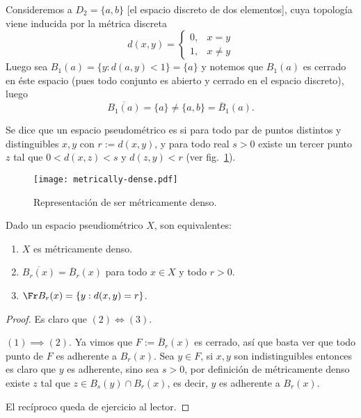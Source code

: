 \documentclass[topologia-analisis.tex]{subfiles}
\begin{document}
\begin{exn}[$D_2$]
	Consideremos a $D_2 = \{a, b\}$ [el espacio discreto de dos elementos], cuya topología viene inducida por la métrica discreta
	$$ d(x, y) =
	\begin{cases}
		0, &x=y \\
		1, &x\ne y
	\end{cases} $$
	Luego sea $B_1(a) = \{ y : d(a, y) < 1 \} = \{a\}$ y notemos que $B_1(a)$ es cerrado en éste espacio (pues todo conjunto es abierto y cerrado en el
	espacio discreto), luego
	$$ \overline{B_1(a)} = \{a\} \ne \{a, b\} = \overline B_1(a). $$
\end{exn}

\begin{mydef}
	Se dice que un espacio pseudométrico es  si para todo par de puntos distintos y distinguibles $x, y$ con $r := d(x, y)$,
	y para todo real $s > 0$ existe un tercer punto $z$ tal que $0 < d(x, z) < s$ y $d(z, y) < r$ (ver fig.~\ref{fig:metrically-dense}).
\end{mydef}
\begin{figure}[!hbt]
	\centering
	\texttt{[image: metrically-dense.pdf]}
	\caption{Representación de ser métricamente denso.}%
	\label{fig:metrically-dense}
\end{figure}

\begin{thm}
	Dado un espacio pseudiométrico $X$, son equivalentes:
	\begin{enumerate}
		\item $X$ es métricamente denso.
		\item $\overline{ B_r(x) } = \overline B_r(x)$ para todo $x\in X$ y todo $r > 0$.
		\item $\Fr B_r(x) = \{ y : d(x, y) = r \}$.
	\end{enumerate}
\end{thm}
\begin{proof}
	Es claro que $(2) \iff (3)$.
	\par
	$(1) \implies (2)$.
	Ya vimos que $F := \overline B_r(x)$ es cerrado, así que basta ver que todo punto de $F$ es adherente a $B_r(x)$.
	Sea $y \in F$, si $x,y$ son indistinguibles entonces es claro que $y$ es adherente, sino sea $s > 0$,
	por definición de métricamente denso existe $z$ tal que $z \in B_s(y) \cap B_r(x)$, es decir, $y$ es adherente a $B_r(x)$.
	\par
	El recíproco queda de ejercicio al lector.
\end{proof}
\end{document}
